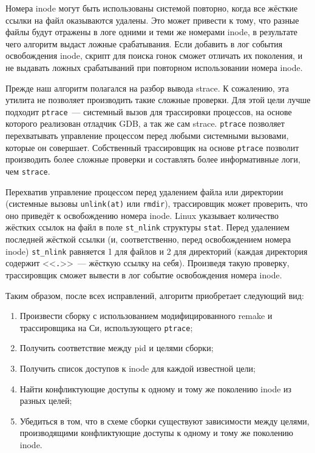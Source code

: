 Номера inode могут быть использованы системой повторно, когда все жёсткие ссылки на файл оказываются удалены. Это может привести к тому, что разные файлы будут отражены в логе одними и теми же номерами inode, в результате чего алгоритм выдаст ложные срабатывания. Если добавить в лог события освобождения inode, скрипт для поиска гонок сможет отличать их поколения, и не выдавать ложных срабатываний при повторном использовании номера inode.

Прежде наш алгоритм полагался на разбор вывода strace. К сожалению, эта утилита не позволяет производить такие сложные проверки. Для этой цели лучше подходит \texttt{ptrace}~--- системный вызов для трассировки процессов, на основе которого реализован отладчик GDB, а так же сам strace. \texttt{ptrace} позволяет перехватывать управление процессом перед любыми системными вызовами, которые он совершает. Собственный трассировщик на основе \texttt{ptrace} позволит производить более сложные проверки и составлять более информативные логи, чем \texttt{strace}.

Перехватив управление процессом перед удалением файла или директории (системные вызовы \texttt{unlink(at)} или \texttt{rmdir}), трассировщик может проверить, что оно приведёт к освобождению номера inode. Linux указывает количество жёстких ссылок на файл в поле \texttt{st\_nlink} структуры \texttt{stat}. Перед удалением последней жёсткой ссылки (и, соответственно, перед освобождением номера inode) \texttt{st\_nlink} равняется 1 для файлов и 2 для директорий (каждая директория содержит <<\texttt{.}>>~--- жёсткую ссылку на себя). Произведя такую проверку, трассировщик сможет вывести в лог событие освобождения номера inode.

Таким образом, после всех исправлений, алгоритм приобретает следующий вид:

\begin{enumerate}
	\item Произвести сборку с использованием модифицированного remake и трассировщика на Си, использующего \texttt{ptrace};
	\item Получить соответствие между pid и целями сборки;
	\item Получить список доступов к inode для каждой известной цели;
	\item Найти конфликтующие доступы к одному и тому же поколению inode из разных целей;
	\item Убедиться в том, что в схеме сборки существуют зависимости между целями, производящими конфликтующие доступы к одному и тому же поколению inode.
\end{enumerate}


